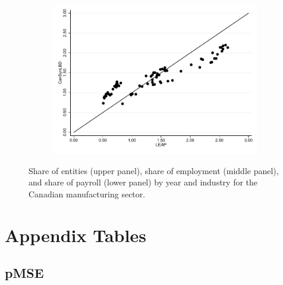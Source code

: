 \begin{figure}[H]
\begin{subfigure}[h]{0.5\linewidth}
\includegraphics[trim=0 0 0 -20,clip,width=\linewidth]{graphs/Share_of_payroll_by_NAICS_two-digit_and_year_Manufacturing_bw.pdf}
\end{subfigure}
\caption{Share of entities (upper panel), share of employment (middle panel), and share of payroll (lower panel) by year and industry for the Canadian manufacturing sector.}\label{fig:FirmShare_manufac}
\end{figure}


































\FloatBarrier
\clearpage

\section{Appendix Tables}
\label{sec:appendix_tables}






\subsection{pMSE}
\label{sec:pmse_tables}











